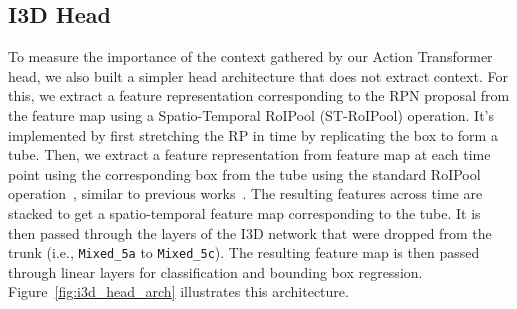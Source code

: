 \documentclass[10pt,twocolumn,letterpaper]{article}
\newcommand{\Tx}[0]{Action Transformer}
\begin{document}
\subsection{I3D Head}\label{sec:app:i3d_head}

To measure the importance of the context gathered by our \Tx{} head, we also built a 
simpler head architecture that does not extract context.
For this, we extract a feature representation corresponding to the RPN proposal from the feature map using a Spatio-Temporal RoIPool (ST-RoIPool) operation. It's implemented by
first stretching the RP in time by replicating the box to form a tube. Then, we extract a feature representation from feature map at each time point using the corresponding box from the tube using the standard RoIPool operation~\cite{huang2017speed}, similar to previous works~\cite{girdhar2018detecttrack}. The resulting features across time are stacked to get a spatio-temporal feature map corresponding to the tube. 
It is then passed through the layers of the I3D network that were dropped from the trunk (i.e., {\tt Mixed\_5a} to {\tt Mixed\_5c}). The resulting feature map is then passed through linear layers for classification and bounding box regression.
Figure~\ref{fig:i3d_head_arch} illustrates this architecture.
\end{document}
